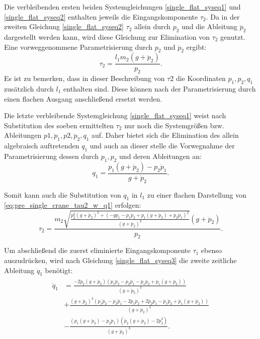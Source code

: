 Die verbleibenden ersten beiden Systemgleichungen \ref{single_flat_syseq1} und \ref{single_flat_syseq2} enthalten jeweils die Eingangskomponente $\tau_2$. Da in der zweiten Gleichung \ref{single_flat_syseq2} $\tau_2$ allein durch $p_2$ und die Ableitung $\ddot{p}_2$ dargestellt werden kann, wird diese Gleichung zur Elimination von $\tau_2$ genutzt. Eine vorweggenommene Parametrisierung durch $p_2$ und $\ddot{p}_2$ ergibt:
\begin{equation}
	\label{eq:pre_single_crane_tau2_w_q1}
	\tau_2 = \frac{l_{1} m_{2} \left(g + \ddot{p}_{2}\right)}{p_{2}}.
\end{equation}
Es ist zu bemerken, dass in dieser Beschreibung von $\tau2$ die Koordinaten $p_1, p_2, q_1$ zusätzlich durch $l_1$ enthalten sind. Diese können nach der Parametrisierung durch einen flachen Ausgang anschließend ersetzt werden. 

Die letzte verbleibende Systemgleichung \ref{single_flat_syseq1} weist nach Substitution des soeben ermittelten $\tau_2$ nur noch die Systemgrößen bzw. Ableitungen $p1, \ddot{p}_1, p2, \ddot{p}_2, q_1$ auf. Daher bietet sich die Elimination des allein algebraisch auftretenden $q_1$ und auch an dieser stelle die Vorwegnahme der Parametrisierung dessen durch $p_1, p_2$ und deren Ableitungen an: 
\begin{equation}
	q_1 = \frac{p_{1} \left(g + \ddot{p}_{2}\right) - p_{2} \ddot{p}_{1}}{g + \ddot{p}_{2}}.
\end{equation}

Somit kann auch die Substitution von $q_1$ in $l_1$ zu einer flachen Darstellung von \ref{eq:pre_single_crane_tau2_w_q1} erfolgen:
\begin{equation}
	\tau_2 =
	\frac{m_{2} \sqrt{\frac{p_{2}^{2} \left(g + \ddot{p}_{2}\right)^{2} + \left(- g p_{1} - p_{1} \ddot{p}_{2} + p_{1} \left(g + \ddot{p}_{2}\right) + p_{2} \ddot{p}_{1}\right)^{2}}{\left(g + \ddot{p}_{2}\right)^{2}}} \left(g + \ddot{p}_{2}\right)}{p_{2}}.
\end{equation}

Um abschließend die zuerst eliminierte Eingangskomponente $\tau_1$ ebenso auszudrücken, wird nach Gleichung \ref{single_flat_syseq3} die zweite zeitliche Ableitung $\ddot{q}_1$ benötigt:
\begin{align}
	\begin{split}
	\ddot{q}_1 &=
	\frac{-2 \dddot{p}_{2} \left(g + \ddot{p}_{2}\right) \left(p_{1} \dddot{p}_{2} - p_{2} \dddot{p}_{1} - \ddot{p}_{1} \dot{p}_{2} + \dot{p}_{1} \left(g + \ddot{p}_{2}\right)\right) }{\left(g + \ddot{p}_{2}\right)^{3}} \\	
	&+ \frac{\left(g + \ddot{p}_{2}\right)^{2} \left(p_{1} \ddddot{p}_{2} - p_{2} \ddddot{p}_{1} - 2 \dddot{p}_{1} \dot{p}_{2} + 2 \dddot{p}_{2} \dot{p}_{1} - \ddot{p}_{1} \ddot{p}_{2} + \ddot{p}_{1} \left(g + \ddot{p}_{2}\right)\right)}{\left(g + \ddot{p}_{2}\right)^{3}}\\	
	&- \frac{\left(p_{1} \left(g + \ddot{p}_{2}\right) - p_{2} \ddot{p}_{1}\right) \left(\ddddot{p}_{2} \left(g + \ddot{p}_{2}\right) - 2 \dddot{p}_{2}^{2}\right)}{\left(g + \ddot{p}_{2}\right)^{3}}.
	\end{split}
\end{align}

